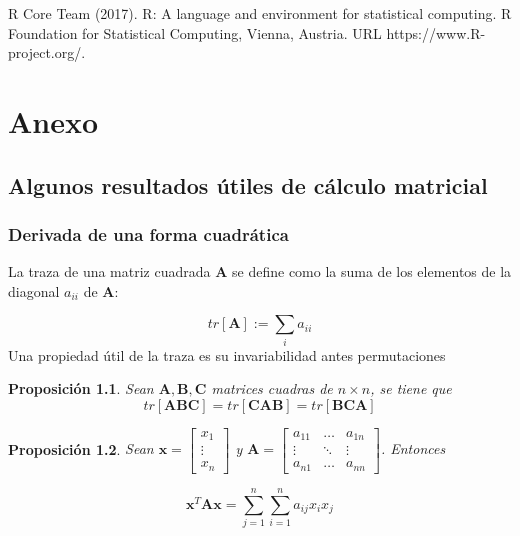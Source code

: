 \documentclass[12pt, twoside]{book}\usepackage[]{graphicx}\usepackage[]{color}
\numberwithin{equation}{section}
\numberwithin{theorem}{section}
\newtheorem{teorema}{Proposición}
\numberwithin{teorema}{section}
\numberwithin{defi}{section}
\numberwithin{prop}{section}
\numberwithin{defi}{section}
\theoremstyle{plain}
\begin{document}
R Core Team (2017). R: A language and environment for statistical computing.
  R Foundation for Statistical Computing, Vienna, Austria. URL
  https://www.R-project.org/.

  
\chapter{Anexo}
\section{Algunos resultados útiles de cálculo matricial}

\subsection{Derivada de una forma cuadrática}
La traza de una matriz cuadrada $\mathbf{A}$ se define como la suma de los elementos de la diagonal $a_{ii}$ de $\mathbf{A}$: 

\begin{equation}
tr[\mathbf{A}]:= \sum_{i}a_{ii}
\end{equation}
Una propiedad útil de la traza es su invariabilidad antes permutaciones

\begin{teorema}
Sean $\mathbf{A,B,C}$ matrices cuadras de $n\times n$, se tiene que
\begin{equation}
tr[\mathbf{ABC}] = tr[\mathbf{CAB}] = tr[\mathbf{BCA}]
\end{equation}
\end{teorema}

\begin{teorema}
Sean $\mathbf{x} = \left[\begin{array}{c} x_{1} \\ \vdots \\ x_{n} \end{array}\right]$ y $\mathbf{A} =
\left[\begin{array}{ccc}
a_{11} & \hdots & a_{1n} \\ 
\vdots & \ddots & \vdots \\ 
a_{n1} & \hdots & a_{nn}
\end{array}\right]$. Entonces

\begin{equation}
\mathbf{x}^{T}\mathbf{Ax} = \sum_{j=1}^{n}\sum_{i=1}^{n}a_{ij}x_{i}x_{j}
\end{equation}
\end{teorema}
\end{document}
